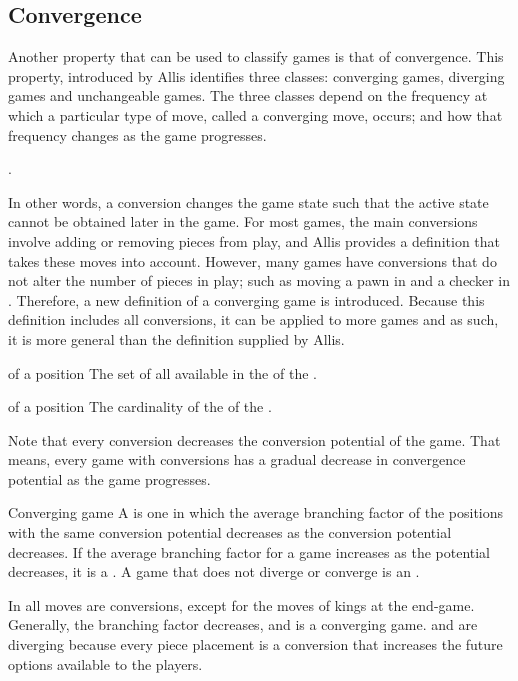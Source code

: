 \subsection{Convergence}
\label{sec:games:convergence}
Another property that can be used to classify games is that of convergence.  This property, introduced by Allis \cite{allis:which} identifies three classes:  converging games, diverging games and unchangeable games. The three classes depend on the frequency at which a particular type of move, called a converging move, occurs; and how that frequency changes as the game progresses.  

.  

In other words, a conversion changes the game state such that the active state cannot be obtained later in the game. For most games, the main conversions involve adding or removing pieces from play, and Allis \cite{allis:which} provides a definition that takes these moves into account.  However, many games have conversions that do not alter the number of pieces in play; such as moving a pawn in  and a checker in .  Therefore, a new definition of a converging game is introduced. Because this definition includes all conversions, it can be applied to more games and as such, it is more general than the definition supplied by Allis.

 {of a position} {The set of all  available in the  of the .}
 
 {of a position} {The cardinality of the  of the .}

\iamhere %

Note that every conversion decreases the conversion potential of the game. That means, every game with conversions has a gradual decrease in convergence potential as the game progresses.  

\begin{definition} {Converging game}
A  is one in which the average branching factor of the positions with the same conversion potential decreases as the conversion potential decreases.  If the average branching factor for a game increases as the potential decreases, it is a . A game that does not diverge or converge is an .
\end{definition}
In  all moves are conversions, except for the moves of kings at the end-game.  Generally, the branching factor decreases, and  is a converging game.  and  are diverging because every piece placement is a conversion that increases the future options available to the players. 

